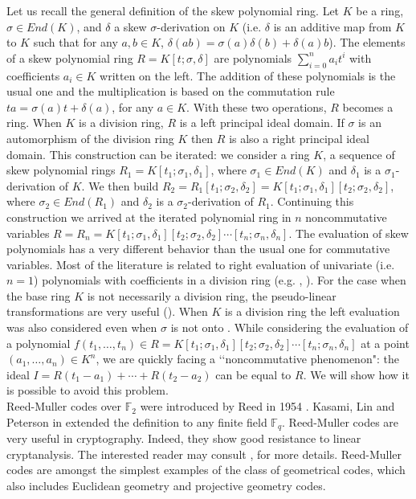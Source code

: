 \documentclass{amsproc}
\newcommand{\de}{\delta}
\newcommand{\si}{\sigma}
\numberwithin{equation}{section}
\newcommand{\mulo}{K[t_1;\si_1,\de_1][t_2;\si_2,\de_2]\cdots[t_n;\si_n,\de_n]}
\begin{document}
Let us recall the general definition of the skew polynomial ring.  
Let $K$ be a ring, $\si \in End(K)$, and $\de$ a skew $\si$-derivation on $K$ (i.e. $\de$ is an additive map from $K$ to $K$ such that for any $a,b\in K$, $\de(ab)=\si(a)\de(b)+\de(a)b$).   The elements of a skew polynomial ring $R=K[t;\si,\de]$ are polynomials $\sum_{i=0}^na_it^i$ with coefficients $a_i\in K$ written on the left.  
The addition of these polynomials is the usual one and the multiplication is based on the commutation rule $ta=\si(a)t + \de(a)$, for any $a\in K$.   With these two operations, $R$ becomes a ring.   When $K$ is a division ring, $R$ is a left principal ideal domain. If $\si$ is an automorphism of the division ring $K$ then $R$ is also a right principal ideal domain.  This construction can be iterated: we consider a ring $K$, a sequence of skew polynomial rings
$R_1=K[t_1;\si_1,\de_1]$, where $\si_1\in End(K)$ and $\de_1$ is a $\si_1$-derivation of $K$.  We then build
$R_2=R_1[t_1;\si_2,\de_2]=K[t_1;\si_1,\de_1][t_2;\si_2,\de_2]$,  where $\si_2\in End(R_1)$ and $\de_2$ is a $\si_2$-derivation of $R_1$.
Continuing this construction we arrived at
the iterated polynomial ring in $n$ noncommutative variables
$R=R_n=K[t_1;\si_1,\de_1][t_2;\si_2,\de_2]\cdots[t_n;\si_n,\de_n]$.  
The evaluation of skew polynomials has a very different behavior than the usual one for commutative variables.   Most of the literature is related to right evaluation of univariate (i.e. $n=1$) polynomials with coefficients in a division ring (e.g. \cite{ LLO}, \cite{L2}).  For the case when the base ring $K$ is not necessarily a division ring, the pseudo-linear transformations are very useful (\cite{L2}).   When $K$ is a division ring the left evaluation was also considered even when $\si$ is not onto \cite{lam}.  
While considering the evaluation of a polynomial $f(t_1,\dots,t_n)\in R=\mulo$ at a point $(a_1,\dots,a_n)\in K^n$, we are quickly facing a \lq \lq noncommutative phenomenon":  the ideal 
$I=R(t_1-a_1)+\cdots +R(t_2-a_2)$ can be equal to $R$.  We will show how it is possible to avoid this problem. \\
Reed-Muller codes over $\mathbb{F}_2$ were introduced by Reed in 1954 \cite{bib4}.   Kasami, Lin and Peterson in  \cite{bib2} extended the definition to any finite field $\mathbb{F}_q$.  Reed-Muller codes are very useful in cryptography. Indeed, they show good resistance to linear cryptanalysis.   The interested reader may consult  \cite{bib5}, for more details. Reed-Muller codes are amongst the simplest examples of the class of geometrical codes,  which also includes Euclidean  geometry and projective geometry codes.  
\end{document}
